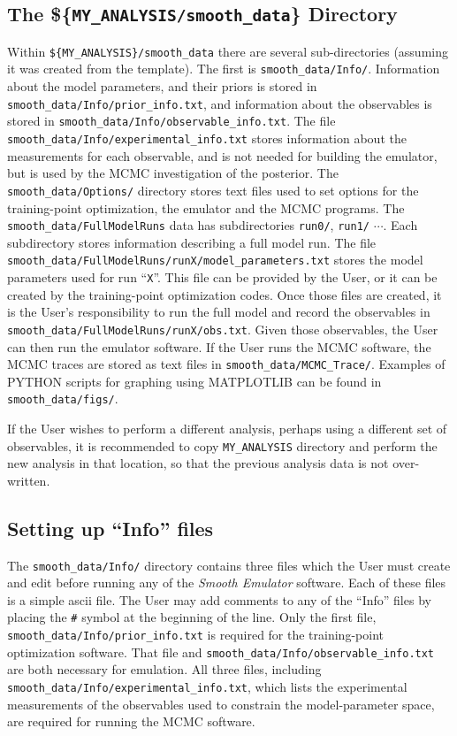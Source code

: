 \documentclass[UserManual.tex]{subfiles}
\begin{document}
\subsection{The \$\{{\tt MY\_ANALYSIS/smooth\_data}\} Directory}

Within {\tt \$\{MY\_ANALYSIS\}/smooth\_data} there are several sub-directories (assuming it was created from the template). The first is {\tt smooth\_data/Info/}. Information about the model parameters, and their priors is stored in {\tt smooth\_data/Info/prior\_info.txt}, and information about the observables is stored in {\tt smooth\_data/Info/observable\_info.txt}. The file {\tt smooth\_data/Info/experimental\_info.txt} stores information about the measurements for each observable, and is not needed for building the emulator, but is used by the MCMC investigation of the posterior. The {\tt smooth\_data/Options/} directory stores text files used to set options for the training-point optimization, the emulator and the MCMC programs. The {\tt smooth\_data/FullModelRuns} data has subdirectories {\tt run0/}, {\tt run1/} $\cdots$. Each subdirectory stores information describing a full model run. The file {\tt smooth\_data/FullModelRuns/runX/model\_parameters.txt} stores the model parameters used for run ``{\tt X}''. This file can be provided by the User, or it can be created by the training-point optimization codes. Once those files are created, it is the User's responsibility to run the full model and record the observables in {\tt smooth\_data/FullModelRuns/runX/obs.txt}. Given those observables, the User can then run the emulator software. If the User runs the MCMC software, the MCMC traces are stored as text files in {\tt smooth\_data/MCMC\_Trace/}. Examples of PYTHON scripts for graphing using MATPLOTLIB can be found in {\tt smooth\_data/figs/}.


If the User wishes to perform a different analysis, perhaps using a different set of observables, it is recommended to copy {\tt MY\_ANALYSIS} directory and perform the new analysis in that location, so that the previous analysis data is not over-written.

\subsection{Setting up ``Info'' files}
The {\tt smooth\_data/Info/} directory contains three files which the User must create and edit before running any of the {\it Smooth Emulator} software. Each of these files is a simple ascii file. The User may add comments to any of the ``Info'' files by placing the {\tt \#} symbol at the beginning of the line. Only the first file, {\tt smooth\_data/Info/prior\_info.txt} is required for the training-point optimization software. That file and {\tt smooth\_data/Info/observable\_info.txt} are both necessary for emulation. All three files, including {\tt smooth\_data/Info/experimental\_info.txt}, which lists the experimental measurements of the observables used to constrain the model-parameter space, are required for running the MCMC software.
\end{document}

